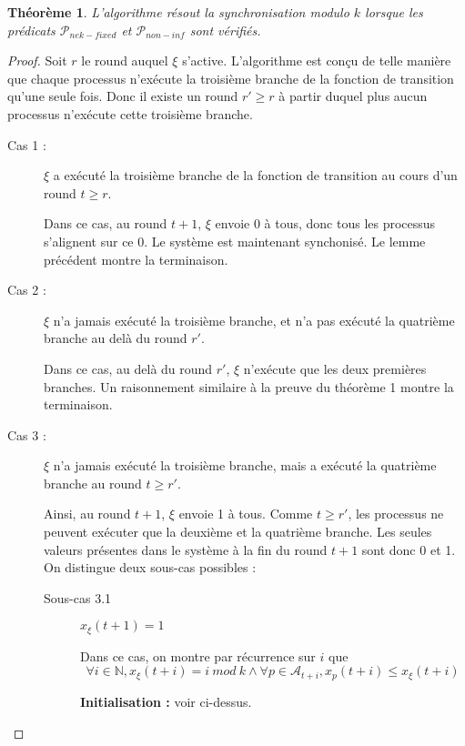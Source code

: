 \documentclass{article}
\newtheorem{theorem}{Théorème}
\begin{document}
\begin{theorem}
	L'algorithme résout la synchronisation modulo $k$ lorsque les prédicats $\mathcal{P}_{nek-fixed}$ et $\mathcal{P}_{non-inf}$ sont vérifiés.
\end{theorem}
\begin{proof}
	Soit $r$ le round auquel $\xi$ s'active.
	L'algorithme est conçu de telle manière que chaque processus n'exécute la troisième branche de la fonction de transition qu'une seule fois.
	Donc il existe un round $r' \geq r$ à partir duquel plus aucun processus n'exécute cette troisième branche.

	\begin{description}

		\item[Cas 1 : ] $\xi$ a exécuté la troisième branche de la fonction de transition au cours d'un round $t \geq r$.

			Dans ce cas, au round $t+1$, $\xi$ envoie 0 à tous, donc tous les processus s'alignent sur ce 0. Le système est maintenant synchonisé. Le lemme précédent montre la terminaison.

		\item[Cas 2 : ] $\xi$ n'a jamais exécuté la troisième branche, et n'a pas exécuté la quatrième branche au delà du round $r'$.

			Dans ce cas, au delà du round $r'$, $\xi$ n'exécute que les deux premières branches. Un raisonnement similaire à la preuve du théorème 1 montre la terminaison.

		\item[Cas 3 : ] $\xi$ n'a jamais exécuté la troisième branche, mais a exécuté la quatrième branche au round $t \geq r'$.

			Ainsi, au round $t+1$, $\xi$ envoie 1 à tous. Comme $t \geq r'$, les processus ne peuvent exécuter que la deuxième et la quatrième branche.
			Les seules valeurs présentes dans le système à la fin du round $t+1$ sont donc 0 et 1.
			On distingue deux sous-cas possibles :

			\begin{description}

				\item[Sous-cas 3.1] $x_\xi(t+1) = 1$

					Dans ce cas, on montre par récurrence sur $i$ que
					$$\forall i \in \mathds{N}, x_\xi(t+i) = i~mod~k \wedge \forall p \in \mathcal{A}_{t+i}, x_p(t+i) \leq x_\xi(t+i)$$

					\textbf{Initialisation : } voir ci-dessus.


\end{description}
\end{description}
\end{proof}
\end{document}
